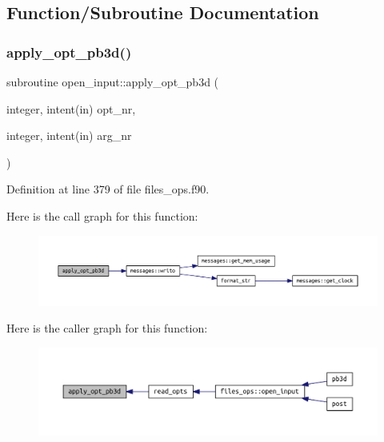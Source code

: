 \subsection{Function/\+Subroutine Documentation}
\mbox{\label{files__ops_8f90_a0aab73e3be6acf8b28310674ffabb246}} 
\subsubsection{\texorpdfstring{apply\+\_\+opt\+\_\+pb3d()}{apply\_opt\_pb3d()}}
{\footnotesize\ttfamily subroutine open\+\_\+input\+::apply\+\_\+opt\+\_\+pb3d (\begin{DoxyParamCaption}\item[{integer, intent(in)}]{opt\+\_\+nr,  }\item[{integer, intent(in)}]{arg\+\_\+nr }\end{DoxyParamCaption})}



Definition at line 379 of file files\+\_\+ops.\+f90.

Here is the call graph for this function\+:
\nopagebreak
\begin{figure}[H]
\begin{center}
\leavevmode
\includegraphics[width=350pt]{files__ops_8f90_a0aab73e3be6acf8b28310674ffabb246_cgraph}
\end{center}
\end{figure}
Here is the caller graph for this function\+:
\nopagebreak
\begin{figure}[H]
\begin{center}
\leavevmode
\includegraphics[width=350pt]{files__ops_8f90_a0aab73e3be6acf8b28310674ffabb246_icgraph}
\end{center}
\end{figure}
\mbox{\label{files__ops_8f90_ab06139d4caa922a90cef467aa6cf2cba}} 
